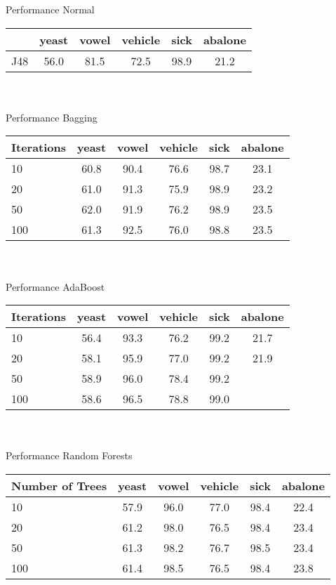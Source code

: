Performance Normal \\
\begin{tabular}{l|c|c|c|c|c}
	             & yeast & vowel & vehicle &  sick & abalone  \\ \hline
J48              &  56.0 &  81.5 &  72.5   &  98.9 & 21.2     \\ 
\end{tabular}\\ \\


Performance Bagging \\
\begin{tabular}{l|c|c|c|c|c}
Iterations       & yeast & vowel & vehicle &  sick & abalone     \\ \hline
10               &  60.8 & 90.4  &  76.6   & 98.7  &  23.1       \\ \hline
20               &  61.0 & 91.3  &  75.9   & 98.9  &  23.2       \\ \hline
50               &  62.0 & 91.9  &  76.2   & 98.9  &  23.5       \\ \hline
100              &  61.3 & 92.5  &  76.0   & 98.8  &  23.5       \\ 
\end{tabular}\\ \\

Performance AdaBoost \\
\begin{tabular}{l|c|c|c|c|c}
Iterations       & yeast & vowel & vehicle &  sick & abalone     \\ \hline
10               & 56.4  &  93.3 &  76.2   &  99.2 &  21.7       \\ \hline
20               & 58.1  &  95.9 &  77.0   &  99.2 &  21.9       \\ \hline
50               & 58.9  &  96.0 &  78.4   &  99.2 &             \\ \hline
100              & 58.6  &  96.5 &  78.8   &  99.0 &             \\ 
\end{tabular}\\ \\


Performance Random Forests \\
\begin{tabular}{l|c|c|c|c|c}
Number of Trees  & yeast & vowel & vehicle &  sick & abalone     \\ \hline
10               & 57.9  & 96.0  & 77.0    &  98.4 &  22.4       \\ \hline
20               & 61.2  & 98.0  & 76.5    &  98.4 &  23.4       \\ \hline
50               & 61.3  & 98.2  & 76.7    &  98.5 &  23.4       \\ \hline
100              & 61.4  & 98.5  & 76.5    &  98.4 &  23.8       \\ 
\end{tabular}\\ \\


